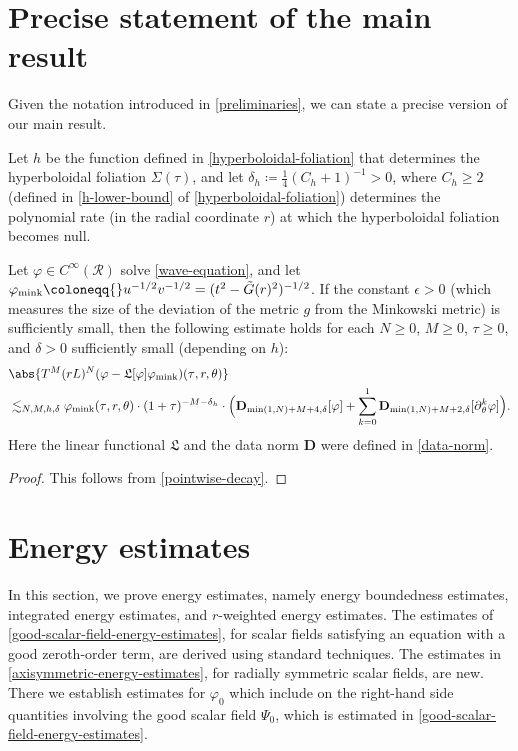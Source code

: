 \documentclass[10pt, reqno]{amsart}
\begin{document}
\section{Precise statement of the main result}
Given the notation introduced in \cref{preliminaries}, we can state a
precise version of our main result.
\begin{theorem}
Let \(h\) be the function defined in \cref{hyperboloidal-foliation} that
determines the hyperboloidal foliation \(\Sigma{}(\tau{})\), and let
\(\delta{}_h\coloneqq{} \frac{1}{4}(C_h + 1)^{-1} > 0\), where \(C_h\ge 2\)
(defined in \cref{h-lower-bound} of \cref{hyperboloidal-foliation}) determines the
polynomial rate (in the radial coordinate \(r\)) at which the hyperboloidal
foliation becomes null.

Let \(\varphi{}\in C^\infty(\mathcal{R})\) solve \cref{wave-equation}, and let
\(\varphi_{\textnormal{mink}}\coloneqq{}u^{-1/2}v^{-1/2}=
(t^2-\tilde{G}(r)^2)^{-1/2}\). If the constant \(\epsilon{} > 0\) (which
measures the size of the deviation of the metric \(g\) from the Minkowski
metric) is sufficiently small, then the following estimate holds for each \(N\ge
0\), \(M\ge 0\), \(\tau{} \ge 0\), and \(\delta{} > 0\) sufficiently small (depending
on \(h\)):
\begin{equation}\label{main-theorem-equation}
\begin{split}
&\abs{T^M(rL)^N(\varphi{} - \mathfrak{L}[\varphi{}]\varphi{}_{\textnormal{mink}})(\tau{},r,\theta{})} \\
&\lesssim_{N,M,h,\delta{}} \varphi{}_{\textnormal{mink}}(\tau{},r,\theta{})\cdot (1+\tau{})^{-M-\delta{}_{h}}\cdot \Bigl(\mathbf{D}_{\min (1,N)+M+4,\delta{}}[\varphi{}] + \sum_{k=0}^1\mathbf{D}_{\min (1,N)+M+2,\delta{}}[\partial{}_\theta^k\varphi{}]\Bigr).
\end{split}
\end{equation}
Here the linear functional \(\mathfrak{L}\) and the data norm \(\mathbf{D}\)
were defined in \cref{data-norm}.
\label{main-theorem}
\end{theorem}
\begin{proof}
This follows from \cref{pointwise-decay}.
\end{proof}
\section{Energy estimates}
\label{sec:energy-estimates}
In this section, we prove energy estimates, namely energy boundedness estimates,
integrated energy estimates, and \(r\)-weighted energy estimates. The estimates
of \cref{good-scalar-field-energy-estimates}, for scalar fields satisfying an
equation with a good zeroth-order term, are derived using standard techniques.
The estimates in \cref{axisymmetric-energy-estimates}, for radially symmetric
scalar fields, are new. There we establish estimates for \(\varphi_0\) which
include on the right-hand side quantities involving the good scalar field
\(\Psi_0\), which is estimated in \cref{good-scalar-field-energy-estimates}.
\end{document}
